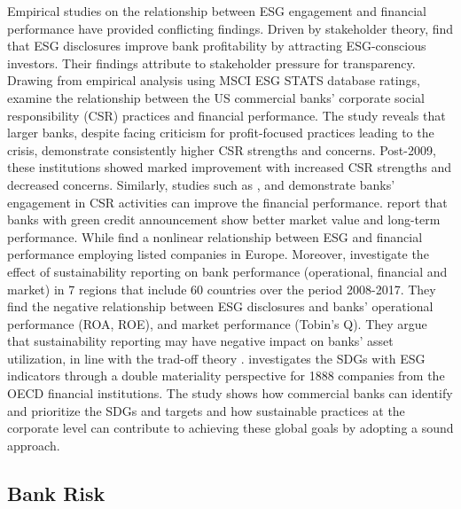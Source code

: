 \documentclass[
  authoryear]{elsarticle}
\begin{document}
Empirical studies on the relationship between ESG engagement and
financial performance have provided conflicting findings. Driven by
stakeholder theory, \citet{WU2013} find that ESG disclosures improve
bank profitability by attracting ESG-conscious investors. Their findings
attribute to stakeholder pressure for transparency. Drawing from
empirical analysis using MSCI ESG STATS database ratings,
\citet{CORNETT2016} examine the relationship between the US commercial
banks' corporate social responsibility (CSR) practices and financial
performance. The study reveals that larger banks, despite facing
criticism for profit-focused practices leading to the crisis,
demonstrate consistently higher CSR strengths and concerns. Post-2009,
these institutions showed marked improvement with increased CSR
strengths and decreased concerns. Similarly, studies such as
\citet{CARNEVALE2014}, \citet{SHEN2016} and \citet{BUALLAY2021}
demonstrate banks' engagement in CSR activities can improve the
financial performance. \citet{TIAN2023} report that banks with green
credit announcement show better market value and long-term performance.
While \citet{FERRERO2016} find a nonlinear relationship between ESG and
financial performance employing listed companies in Europe. Moreover,
\citet{BUALLAY2023} investigate the effect of sustainability reporting
on bank performance (operational, financial and market) in 7 regions
that include 60 countries over the period 2008-2017. They find the
negative relationship between ESG disclosures and banks' operational
performance (ROA, ROE), and market performance (Tobin's Q). They argue
that sustainability reporting may have negative impact on banks' asset
utilization, in line with the trad-off theory \citep[see][]{LEE2009}.
\citet{ARAS2024} investigates the SDGs with ESG indicators through a
double materiality perspective for 1888 companies from the OECD
financial institutions. The study shows how commercial banks can
identify and prioritize the SDGs and targets and how sustainable
practices at the corporate level can contribute to achieving these
global goals by adopting a sound approach.

\subsection{Bank Risk}\label{bank-risk}
\end{document}
